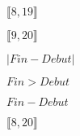 \documentclass{article}
\begin{document}
$ \llbracket 8, 19 \rrbracket $
\pagebreak

$ \llbracket 9, 20 \rrbracket $
\pagebreak

$ \vert Fin - Debut \vert $
\pagebreak

$ Fin \gt Debut $
\pagebreak

$ Fin - Debut $
\pagebreak

$ \llbracket 8, 20 \rrbracket $
\pagebreak
\end{document}
